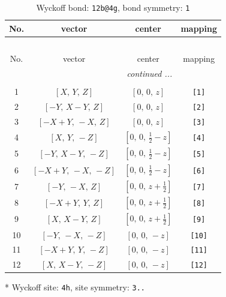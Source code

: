 \documentclass[fleqn,8pt]{jsarticle}
\begin{document}
\begin{longtable}{cccc}
\caption{Wyckoff bond: {\tt 12b@4g}, bond symmetry: {\tt 1}}
 \\
 \hline \hline
No. & vector & center & mapping \\ \hline \endfirsthead

\multicolumn{3}{l}{\tablename\ \thetable{}} \\
 \hline \hline
No. & vector & center & mapping \\ \hline \endhead

 \hline \hline
\multicolumn{3}{r}{\footnotesize\it continued ...} \\ \endfoot

 \hline \hline
\multicolumn{3}{r}{} \\ \endlastfoot

1 & $\left[ X,\, Y,\, Z \right]$ & $\left[ 0,\, 0,\, z \right]$ & {\tt [1]} \\ \hline
2 & $\left[ - Y,\, X - Y,\, Z \right]$ & $\left[ 0,\, 0,\, z \right]$ & {\tt [2]} \\ \hline
3 & $\left[ - X + Y,\, - X,\, Z \right]$ & $\left[ 0,\, 0,\, z \right]$ & {\tt [3]} \\ \hline
4 & $\left[ X,\, Y,\, - Z \right]$ & $\left[ 0,\, 0,\, \frac{1}{2} - z \right]$ & {\tt [4]} \\ \hline
5 & $\left[ - Y,\, X - Y,\, - Z \right]$ & $\left[ 0,\, 0,\, \frac{1}{2} - z \right]$ & {\tt [5]} \\ \hline
6 & $\left[ - X + Y,\, - X,\, - Z \right]$ & $\left[ 0,\, 0,\, \frac{1}{2} - z \right]$ & {\tt [6]} \\ \hline
7 & $\left[ - Y,\, - X,\, Z \right]$ & $\left[ 0,\, 0,\, z + \frac{1}{2} \right]$ & {\tt [7]} \\ \hline
8 & $\left[ - X + Y,\, Y,\, Z \right]$ & $\left[ 0,\, 0,\, z + \frac{1}{2} \right]$ & {\tt [8]} \\ \hline
9 & $\left[ X,\, X - Y,\, Z \right]$ & $\left[ 0,\, 0,\, z + \frac{1}{2} \right]$ & {\tt [9]} \\ \hline
10 & $\left[ - Y,\, - X,\, - Z \right]$ & $\left[ 0,\, 0,\, - z \right]$ & {\tt [10]} \\ \hline
11 & $\left[ - X + Y,\, Y,\, - Z \right]$ & $\left[ 0,\, 0,\, - z \right]$ & {\tt [11]} \\ \hline
12 & $\left[ X,\, X - Y,\, - Z \right]$ & $\left[ 0,\, 0,\, - z \right]$ & {\tt [12]} \\
\end{longtable}
* Wyckoff site: {\tt 4h}, site symmetry: {\tt 3..}
\end{document}
